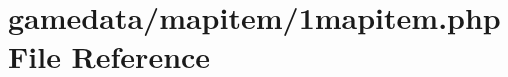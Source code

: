 \hypertarget{1mapitem_8php}{\section{gamedata/mapitem/1mapitem.php File Reference}
\label{1mapitem_8php}
}
